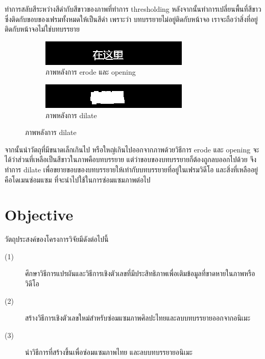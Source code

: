 \documentclass[hidelinks,a4paper,14pt]{article}
\numberwithin{equation}{section}							%
\begin{document}
{		ทำการสลับสีระหว่างสีดำกับสีขาวของภาพที่ทำการ thresholding หลังจากนั้นทำการเปลี่ยนพื้นที่สีขาวซึ่งติดกับขอบของเฟรมทั้งหมดให้เป็นสีดำ เพราะว่า บทบรรยายไม่อยู่ติดกับหน้าจอ เราจะถือว่าสิ่งที่อยู่ติดกับหน้าจอไม่ใช่บทบรรยาย
		
		\begin{figure}[H]
			\begin{subfigure}{0.4\linewidth}
				\centering
				\includegraphics[width=0.4\linewidth]{images/detection-erode-opening.png}
				\caption{ภาพหลังการ erode และ opening}
			\end{subfigure}
			\begin{subfigure}{0.4\linewidth}
				\centering
				\includegraphics[width=0.4\linewidth]{images/detection-stoke.png}
				\caption{ภาพหลังการ dilate}
			\end{subfigure}
		\end{figure}
		
		จากนั้นนำวัตถุที่มีขนาดเล็กเกินไป หรือใหญ่เกินไปออกจากภาพด้วยวิธีการ erode และ opening
		จะได้ว่าส่วนที่เหลือเป็นสีขาวในภาพคือบทบรรยาย แต่ว่าขอบของบทบรรยายก็ต้องถูกลบออกไปด้วย จึงทำการ dilate เพื่อขยายขอบของบทบรรยายให้เท่ากับบทบรรยายที่อยู่ในเฟรมวิดีโอ และสิ่งที่เหลืออยู่คือโดเมนซ่อมแซม ที่จะนำไปใช้ในการซ่อมแซมภาพต่อไป
		
\section{Objective}
วัตถุประสงค์ของโครงการวิจัยมีดังต่อไปนี้
\begin{description}
	\item[(1)]	 ศึกษาวิธีการแปรผันและวิธีการเชิงตัวเลขที่มีประสิทธิภาพเพื่อเติมข้อมูลที่ขาดหายในภาพหรือวิดีโอ
	\item[(2)] สร้างวิธีการเชิงตัวเลขใหม่สำหรับซ่อมแซมภาพศิลปะไทยและลบบทบรรยายออกจากอนิเมะ
	\item[(3)] นำวิธีการที่สร้างขึ้นเพื่อซ่อมแซมภาพไทย และลบบทบรรยายอนิเมะ	 
\end{description}

}
\end{document}
